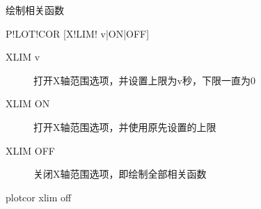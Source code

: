 \label{spe:plotcor}

绘制相关函数

\begin{SACSTX}
P!LOT!COR [X!LIM! v|ON|OFF]
\end{SACSTX}

\begin{description}
\item [XLIM v] 打开X轴范围选项，并设置上限为v秒，下限一直为0
\item [XLIM ON] 打开X轴范围选项，并使用原先设置的上限
\item [XLIM OFF] 关闭X轴范围选项，即绘制全部相关函数
\end{description}

\begin{SACDFT}
plotcor xlim off
\end{SACDFT}

